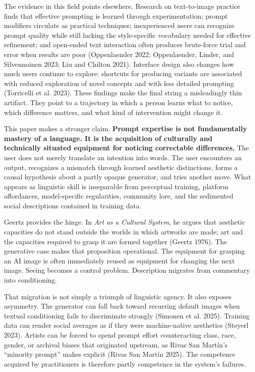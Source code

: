 \documentclass[
  11pt,
  letterpaper,
]{article}
\begin{document}
The evidence in this field points elsewhere. Research on text-to-image
practice finds that effective prompting is learned through
experimentation; prompt modifiers circulate as practical techniques;
inexperienced users can recognize prompt quality while still lacking the
style-specific vocabulary needed for effective refinement; and
open-ended text interaction often produces brute-force trial and error
when results are poor (Oppenlaender 2022; Oppenlaender, Linder, and
Silvennoinen 2023; Liu and Chilton 2021). Interface design also changes
how much users continue to explore: shortcuts for producing variants are
associated with reduced exploration of novel concepts and with less
detailed prompting (Torricelli et al. 2023). These findings make the
final string a misleadingly thin artifact. They point to a trajectory in
which a person learns what to notice, which difference matters, and what
kind of intervention might change it.

This paper makes a stronger claim. \textbf{Prompt expertise is not
fundamentally mastery of a language. It is the acquisition of culturally
and technically situated equipment for noticing correctable
differences.} The user does not merely translate an intention into
words. The user encounters an output, recognizes a mismatch through
learned aesthetic distinctions, forms a causal hypothesis about a partly
opaque generator, and tries another move. What appears as linguistic
skill is inseparable from perceptual training, platform affordances,
model-specific regularities, community lore, and the sedimented social
descriptions contained in training data.

Geertz provides the hinge. In \emph{Art as a Cultural System}, he argues
that aesthetic capacities do not stand outside the worlds in which
artworks are made; art and the capacities required to grasp it are
formed together (Geertz 1976). The generative case makes that
proposition operational. The equipment for grasping an AI image is often
immediately reused as equipment for changing the next image. Seeing
becomes a control problem. Description migrates from commentary into
conditioning.

That migration is not simply a triumph of linguistic agency. It also
exposes asymmetry. The generator can fall back toward recurring default
images when textual conditioning fails to discriminate strongly (Simonen
et al. 2025). Training data can render social averages as if they were
machine-native aesthetics (Steyerl 2023). Artists can be forced to spend
prompt effort counteracting class, race, gender, or archival biases that
originated upstream, as Rivas San Martín's ``minority prompt'' makes
explicit (Rivas San Martín 2025). The competence acquired by
practitioners is therefore partly competence in the system's failures.
\end{document}
